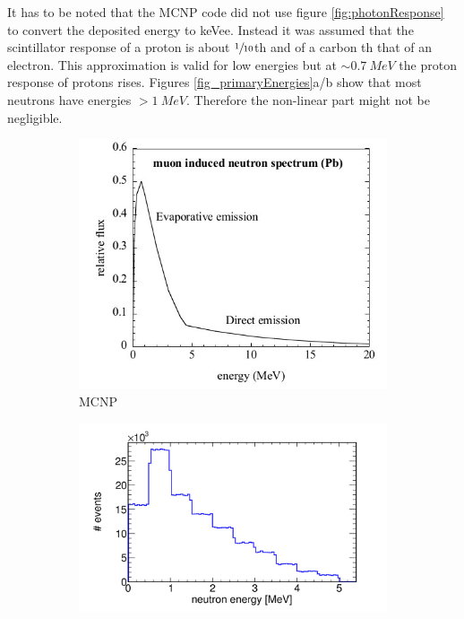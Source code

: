 \documentclass[12pt]{article}
\begin{document}
 It has to be noted that \label{part:eResponse} the MCNP code did not use figure \ref{fig:photonResponse} to convert the deposited energy to keVee. Instead it was assumed that the scintillator response of a proton is about $\sfrac{1}{10}$\hspace{2pt}th and of a carbon \hspace{2pt}th that of an electron. This approximation is valid for low energies but at $\sim\SI{0.7}{MeV}$ the proton response of protons rises. 
 Figures \ref{fig_primaryEnergies}a/b show that most neutrons have energies $>\SI{1}{MeV}$. Therefore the non-linear part might not be negligible.
  \begin{figure}[htbp]
  	\begin{subfigure}[t]{0.4\textwidth}
  		\centering
  		\includegraphics[width=\textwidth]{./pics/primaryEnergy_orig.jpg}
  		\caption{MCNP}
  		\label{fig:primaryEnergyMCNP}
  	\end{subfigure}
  	\begin{subfigure}[t]{0.55\textwidth}
  		\centering
  		\includegraphics[width=\textwidth]{./pics/primaryEnergy.jpg}

\end{subfigure}
\end{figure}
\end{document}
